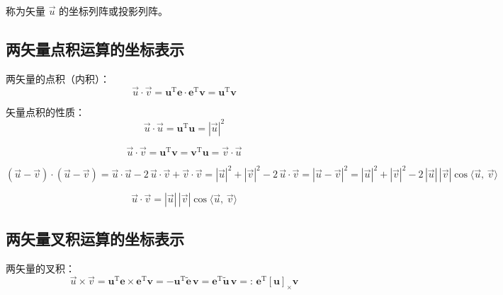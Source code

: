 称为矢量 $\vec{u}$ 的坐标列阵或投影列阵。



\subsection{两矢量点积运算的坐标表示}

两矢量的点积（内积）：
\begin{equation}\label{eq:4.dot_product}
\vec{u} \cdot \vec{v} = \boldsymbol{u}^{\mathrm{T}} \boldsymbol{e} \cdot \boldsymbol{e}^{\mathrm{T}} \boldsymbol{v} = \boldsymbol{u}^{\mathrm{T}} \boldsymbol{v}
\end{equation}

矢量点积的性质：
\begin{equation}
\vec{u} \cdot \vec{u} = \boldsymbol{u}^{\mathrm{T}} \boldsymbol{u} = |\vec{u}|^2 \tag{I}
\end{equation}

\begin{equation}
\vec{u} \cdot \vec{v} = \boldsymbol{u}^{\mathrm{T}} \boldsymbol{v} = \boldsymbol{v}^{\mathrm{T}} \boldsymbol{u} = \vec{v} \cdot \vec{u} \tag{II}
\end{equation}

\begin{equation}
(\vec{u} - \vec{v}) \cdot (\vec{u} - \vec{v}) = \vec{u} \cdot \vec{u} - 2\, \vec{u} \cdot \vec{v} + \vec{v} \cdot \vec{v} = |\vec{u}|^2 + |\vec{v}|^2 - 2\, \vec{u} \cdot \vec{v} = |\vec{u} - \vec{v}|^2 = |\vec{u}|^2 + |\vec{v}|^2 - 2\, |\vec{u}|\, |\vec{v}| \cos\langle \vec{u},\, \vec{v} \rangle
\end{equation}

\begin{equation}
\vec{u} \cdot \vec{v} = |\vec{u}|\, |\vec{v}| \cos\langle \vec{u},\, \vec{v} \rangle \tag{III}
\end{equation}


\subsection{两矢量叉积运算的坐标表示}

两矢量的叉积：
\begin{equation}\label{eq:4.cross_product}
\vec{u} \times \vec{v} = \boldsymbol{u}^{\mathrm{T}} \boldsymbol{e} \times \boldsymbol{e}^{\mathrm{T}} \boldsymbol{v} = -\boldsymbol{u}^{\mathrm{T}} \tilde{\boldsymbol{e}}\, \boldsymbol{v} = \boldsymbol{e}^{\mathrm{T}} \tilde{\boldsymbol{u}}\, \boldsymbol{v} =:\, \boldsymbol{e}^{\mathrm{T}} [\boldsymbol{u}]_\times \boldsymbol{v}
\end{equation}

